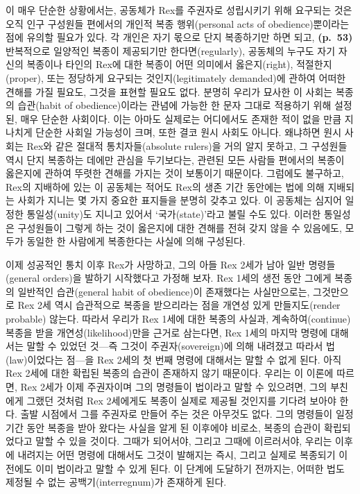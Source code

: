 이 매우 단순한 상황에서는, 공동체가 Rex를 주권자로 성립시키기 위해
요구되는 것은 오직 인구 구성원들 편에서의 개인적 복종 행위(personal acts
of obedience)뿐이라는 점에 유의할 필요가 있다. 각 개인은 자기 몫으로
단지 복종하기만 하면 되고, \textbf{(p.~53)} 반복적으로 일양적인 복종이
제공되기만 한다면(regularly), 공동체의 누구도 자기 자신의 복종이나
타인의 Rex에 대한 복종이 어떤 의미에서 옳은지(right), 적절한지(proper),
또는 정당하게 요구되는 것인지(legitimately demanded)에 관하여 어떠한
견해를 가질 필요도, 그것을 표현할 필요도 없다. 분명히 우리가 묘사한 이
사회는 복종의 습관(habit of obedience)이라는 관념에 가능한 한 문자
그대로 적용하기 위해 설정된, 매우 단순한 사회이다. 이는 아마도 실제로는
어디에서도 존재한 적이 없을 만큼 지나치게 단순한 사회일 가능성이 크며,
또한 결코 원시 사회도 아니다. 왜냐하면 원시 사회는 Rex와 같은 절대적
통치자들(absolute rulers)을 거의 알지 못하고, 그 구성원들 역시 단지
복종하는 데에만 관심을 두기보다는, 관련된 모든 사람들 편에서의 복종이
옳은지에 관하여 뚜렷한 견해를 가지는 것이 보통이기 때문이다. 그럼에도
불구하고, Rex의 지배하에 있는 이 공동체는 적어도 Rex의 생존 기간
동안에는 법에 의해 지배되는 사회가 지니는 몇 가지 중요한 표지들을 분명히
갖추고 있다. 이 공동체는 심지어 일정한 통일성(unity)도 지니고 있어서
‘국가(state)’라고 불릴 수도 있다. 이러한 통일성은 구성원들이 그렇게 하는
것이 옳은지에 대한 견해를 전혀 갖지 않을 수 있음에도, 모두가 동일한 한
사람에게 복종한다는 사실에 의해 구성된다.

이제 성공적인 통치 이후 Rex가 사망하고, 그의 아들 Rex 2세가 남아 일반
명령들(general orders)을 발하기 시작했다고 가정해 보자. Rex 1세의 생전
동안 그에게 복종의 일반적인 습관(general habit of obedience)이
존재했다는 사실만으로는, 그것만으로 Rex 2세 역시 습관적으로 복종을
받으리라는 점을 개연성 있게 만들지도(render probable) 않는다. 따라서
우리가 Rex 1세에 대한 복종의 사실과,  계속하여(continue)
복종을 받을 개연성(likelihood)만을 근거로 삼는다면, Rex 1세의 마지막
명령에 대해서는 말할 수 있었던 것---즉 그것이 주권자(sovereign)에 의해
내려졌고 따라서 법(law)이었다는 점---을 Rex 2세의 첫 번째 명령에
대해서는 말할 수 없게 된다. 아직 Rex 2세에 대한 확립된 복종의 습관이
존재하지 않기 때문이다. 우리는 이 이론에 따르면, Rex 2세가 이제
주권자이며 그의 명령들이 법이라고 말할 수 있으려면, 그의 부친에게 그랬던
것처럼 Rex 2세에게도 복종이 실제로 제공될 것인지를 기다려 보아야 한다.
출발 시점에서 그를 주권자로 만들어 주는 것은 아무것도 없다. 그의
명령들이 일정 기간 동안 복종을 받아 왔다는 사실을 알게 된 이후에야
비로소, 복종의 습관이 확립되었다고 말할 수 있을 것이다. 그때가 되어서야,
그리고 그때에 이르러서야, 우리는 이후에 내려지는 어떤 명령에 대해서도
그것이 발해지는 즉시, 그리고 실제로 복종되기 이전에도 이미 법이라고 말할
수 있게 된다. 이 단계에 도달하기 전까지는, 어떠한 법도 제정될 수 없는
공백기(interregnum)가 존재하게 된다.


